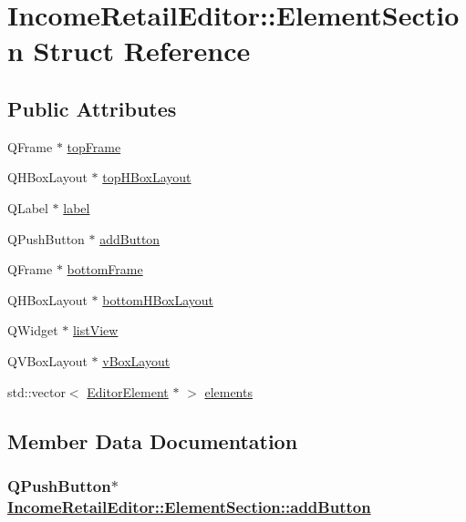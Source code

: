 \hypertarget{structIncomeRetailEditor_1_1ElementSection}{
\section{Income\-Retail\-Editor::Element\-Section Struct Reference}
\label{structIncomeRetailEditor_1_1ElementSection}
}
\subsection*{Public Attributes}
\begin{CompactItemize}
\item 
QFrame $\ast$ \hyperlink{structIncomeRetailEditor_1_1ElementSection_o0}{top\-Frame}
\item 
QHBox\-Layout $\ast$ \hyperlink{structIncomeRetailEditor_1_1ElementSection_o1}{top\-HBox\-Layout}
\item 
QLabel $\ast$ \hyperlink{structIncomeRetailEditor_1_1ElementSection_o2}{label}
\item 
QPush\-Button $\ast$ \hyperlink{structIncomeRetailEditor_1_1ElementSection_o3}{add\-Button}
\item 
QFrame $\ast$ \hyperlink{structIncomeRetailEditor_1_1ElementSection_o4}{bottom\-Frame}
\item 
QHBox\-Layout $\ast$ \hyperlink{structIncomeRetailEditor_1_1ElementSection_o5}{bottom\-HBox\-Layout}
\item 
QWidget $\ast$ \hyperlink{structIncomeRetailEditor_1_1ElementSection_o6}{list\-View}
\item 
QVBox\-Layout $\ast$ \hyperlink{structIncomeRetailEditor_1_1ElementSection_o7}{v\-Box\-Layout}
\item 
std::vector$<$ \hyperlink{classEditorElement}{Editor\-Element} $\ast$ $>$ \hyperlink{structIncomeRetailEditor_1_1ElementSection_o8}{elements}
\end{CompactItemize}


\subsection{Member Data Documentation}
\hypertarget{structIncomeRetailEditor_1_1ElementSection_o3}{
\subsubsection[addButton]{\setlength{\rightskip}{0pt plus 5cm}QPush\-Button$\ast$ \hyperlink{structIncomeRetailEditor_1_1ElementSection_o3}{Income\-Retail\-Editor::Element\-Section::add\-Button}}}
\label{structIncomeRetailEditor_1_1ElementSection_o3}


